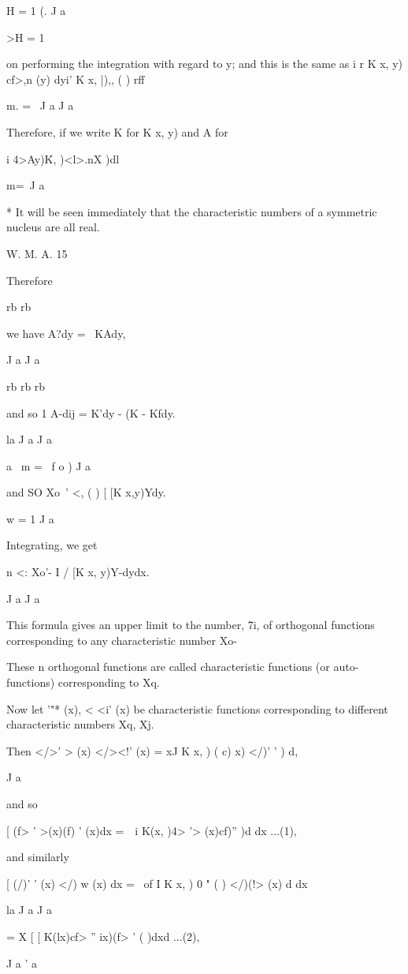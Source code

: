 {H = 1 (. J a

>H = 1

on performing the integration with regard to y; and this is the same
as i r K x, y) cf>,n (y) dyi' K x, |),, ( ) rff

m. = \ J a J a

Therefore, if we write K for K x, y) and A for

i 4>Ay)\' K, )<l>.nX )dl

m=\ J a

* It will be seen immediately that the characteristic numbers of a
symmetric nucleus are all real.

W. M. A. 15

Therefore

%
%

rb rb

we have A?dy = \ KAdy,

J a J a

rb rb rb

and so 1 A-dij = K'dy - (K - Kfdy.

la J a J a

a \ m = \ f o ) J a

and SO Xo~' <, ( ) [ [K x,y)Ydy.

w = 1 J a

Integrating, we get

n <: Xo'- I / [K x, y)Y-dydx.

J a J a

This formula gives an upper limit to the number, 7i, of orthogonal
functions corresponding to any characteristic number Xo-

These n orthogonal functions are called characteristic functions (or
auto- functions) corresponding to Xq.

Now let '"* (x), < <i' (x) be characteristic functions corresponding
to different characteristic numbers Xq, Xj.

Then </>' > (x) </><!' (x) = xJ K x, ) ( c) x) </)' ' ) d,

J a

and so

[ (f> ' >(x)(f) ' (x)dx = \,\ i K(x, )4> '> (x)cf)'' )d dx ...(1),

and similarly

[ (/)' ' (x) </) w (x) dx = \ of I K x, ) 0 " ( ) </)(!> (x) d dx

la J a J a

= X [ [ K(lx)cf> '' ix)(f> ' ( )dxd ...(2),

J a ' a

}
